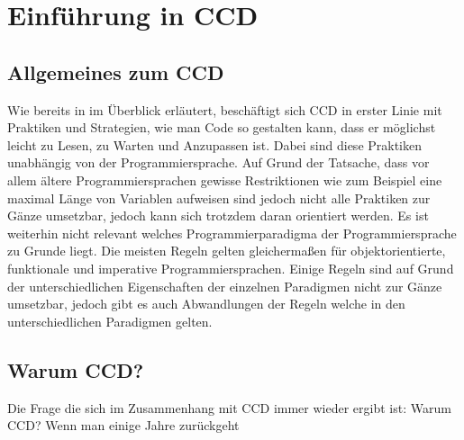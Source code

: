 \chapter{Einführung in CCD}
\label{cha:Diplomschrift}

\section{Allgemeines zum CCD}
Wie bereits in im Überblick erläutert, beschäftigt sich CCD in erster Linie mit Praktiken und Strategien, wie man Code so gestalten kann, dass er möglichst leicht zu Lesen, zu Warten und Anzupassen ist. Dabei sind diese Praktiken unabhängig von der Programmiersprache. Auf Grund der Tatsache, dass vor allem ältere Programmiersprachen gewisse Restriktionen wie zum Beispiel eine maximal Länge von Variablen aufweisen sind jedoch nicht alle Praktiken zur Gänze umsetzbar, jedoch kann sich trotzdem daran orientiert werden. Es ist weiterhin nicht relevant welches Programmierparadigma der Programmiersprache zu Grunde liegt. Die meisten Regeln gelten gleichermaßen für objektorientierte, funktionale und imperative Programmiersprachen. Einige Regeln sind auf Grund der unterschiedlichen Eigenschaften der einzelnen Paradigmen nicht zur Gänze umsetzbar, jedoch gibt es auch Abwandlungen der Regeln welche in den unterschiedlichen Paradigmen gelten. 

\section{Warum CCD?}
Die Frage die sich im Zusammenhang mit CCD immer wieder ergibt ist: Warum CCD? Wenn man einige Jahre zurückgeht

